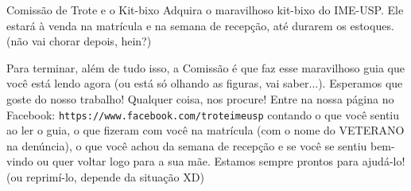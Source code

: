 \begin{secao}{Comissão de Trote e o Kit-bixo}
Adquira o maravilhoso kit-bixo do IME-USP. Ele estará à venda na matrícula e na
semana de recepção, até durarem os estoques. (não vai chorar depois, hein?)


Para terminar, além de tudo isso, a Comissão é que faz esse maravilhoso guia que
você está lendo agora (ou está só olhando as figuras, vai saber...). Esperamos
que goste do nosso trabalho! Qualquer coisa, nos procure! Entre na nossa página
no Facebook: {\tt https://www.facebook.com/troteimeusp} contando o que você 
sentiu ao ler o guia, o que fizeram com você na matrícula (com o nome do 
VETERANO na denúncia), o que
você achou da semana de recepção e se você se sentiu bem-vindo ou quer voltar logo
para a sua mãe. Estamos sempre prontos para ajudá-lo! (ou reprimí-lo, depende
da situação XD)

\end{secao}

